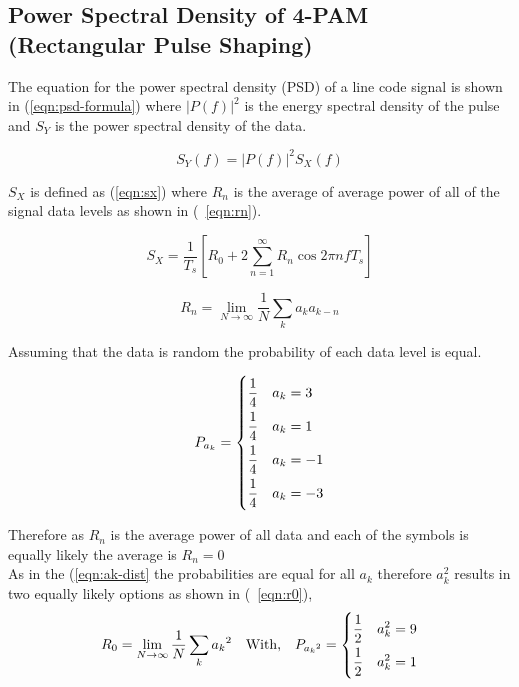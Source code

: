 \subsection{Power Spectral Density of 4-PAM (Rectangular Pulse Shaping)}

The equation for the power spectral density (PSD) of a line code signal is shown in (\ref{eqn:psd-formula}) where $|P(f)|^2$ is
the energy spectral density of the pulse and $S_Y$ is the power spectral density of the data.

\begin{equation}
    \label{eqn:psd-formula}
    S_Y(f) = |P(f)|^2 S_X(f)
\end{equation}

$S_X$ is defined as (\ref{eqn:sx}) where $R_n$ is the average of average power of all of the signal data levels as shown in
(~\ref{eqn:rn}).

\begin{equation}
    \label{eqn:sx}
    S_X = \frac{1}{T_s}[R_0 + 2 \sum_{n=1}^{\infty}{R_n \cos 2 \pi n f T_s}]
\end{equation}

\begin{equation}
    \label{eqn:rn}
    R_n=\lim_{N\to\infty} \frac{1}{N} \sum_{k}a_k a_{k-n}
\end{equation}

Assuming that the data is random the probability of each data level is equal.

\begin{equation}
    \label{eqn:ak-dist}
    P_{a_k} = 
    \begin{dcases}
        \frac{1}{4} \quad a_k = 3 \\
        \frac{1}{4} \quad a_k = 1 \\
        \frac{1}{4} \quad a_k = -1 \\
        \frac{1}{4} \quad a_k = -3
    \end{dcases}
\end{equation}

Therefore as $R_n$ is the average power of all data and each of the symbols is equally likely the average is
$R_n=0$ \\

As in the (\ref{eqn:ak-dist} the probabilities are equal for all $a_k$ therefore $a_k^2$ results in two equally likely 
options as shown in (~\ref{eqn:r0}),
\begin{equation}
    \label{eqn:r0}
    R_0 = \lim_{N\to\infty} \frac{1}{N} \sum_{k} {a_{k}}^2 \quad \textrm{With,} \quad P_{{a_{k}}^2} = 
    \begin{dcases}
        \frac{1}{2} \quad a_k^2 = 9 \\
        \frac{1}{2} \quad a_k^2 = 1
    \end{dcases}
\end{equation}

